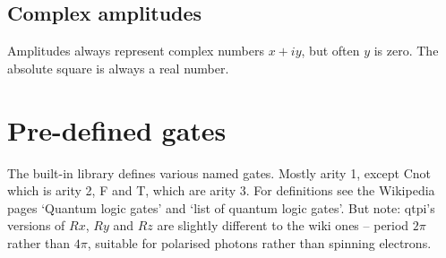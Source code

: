 \subsection{Complex amplitudes}

Amplitudes always represent complex numbers $x+iy$, but often $y$ is zero. The absolute square is always a real number.

\section{Pre-defined gates}

The built-in library defines various named gates. Mostly arity 1, except Cnot which is arity 2, F and T, which are arity 3. For definitions see the Wikipedia pages `Quantum logic gates' and `list of quantum logic gates'. But note: qtpi's versions of $Rx$, $Ry$ and $Rz$ are slightly different to the wiki ones -- period $2\pi$ rather than $4\pi$, suitable for polarised photons rather than spinning electrons. 

